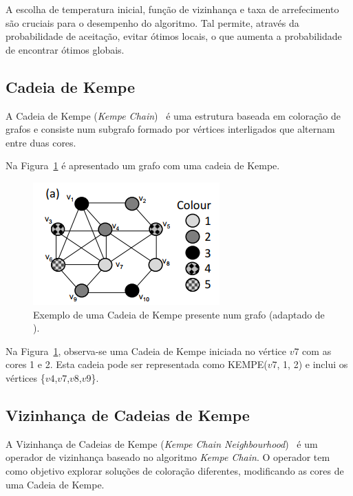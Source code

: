 A escolha de temperatura inicial, função de vizinhança e taxa de arrefecimento são cruciais para o desempenho do algoritmo. Tal permite, através da probabilidade de aceitação, evitar ótimos locais, o que aumenta a probabilidade de encontrar ótimos globais.

\subsection{Cadeia de Kempe}
\label{explic:kempe-chain}

A Cadeia de Kempe (\textit{Kempe Chain})~\cite{GuideGraphColouring-Lewis-2016} é uma estrutura baseada em coloração de grafos e consiste num subgrafo formado por vértices interligados que alternam entre duas cores.

Na Figura~\ref{fig:exemplo-kempe-chain} é apresentado um grafo com uma cadeia de Kempe.

\begin{figure}[H]
    \centering
    \includegraphics[width=.6\linewidth]{Imagens/exemplo-kempe-chain}
    \caption{Exemplo de uma Cadeia de Kempe presente num grafo (adaptado de \cite{GuideGraphColouring-Lewis-2016}).}
    \label{fig:exemplo-kempe-chain}
\end{figure}

Na Figura~\ref{fig:exemplo-kempe-chain}, observa-se uma Cadeia de Kempe iniciada no vértice $v7$ com as cores 1 e 2. Esta cadeia pode ser representada como KEMPE($v7$, 1, 2) e inclui os vértices \{$v4$,$v7$,$v8$,$v9$\}.

\subsection{Vizinhança de Cadeias de Kempe}
\label{explic:kempe-chain-neighbourhood}

A Vizinhança de Cadeias de Kempe (\textit{Kempe Chain Neighbourhood})~\cite{GuideGraphColouring-Lewis-2016} é um operador de vizinhança baseado no algoritmo \textit{Kempe Chain}. O operador tem como objetivo explorar soluções de coloração diferentes, modificando as cores de uma Cadeia de Kempe.

